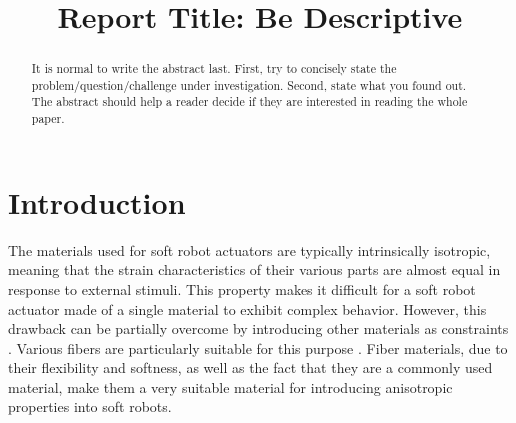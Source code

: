 \documentclass[conference]{IEEEtran}
\begin{document}
\title{Report Title: Be Descriptive}

\author{
    \and
}

\maketitle

\begin{abstract}
It is normal to write the abstract last.  First, try to concisely state the problem/question/challenge under investigation.  Second, state what you found out.  The abstract should help a reader decide if they are interested in reading the whole paper.  
\end{abstract}

% 

\section{Introduction}

The materials used for soft robot actuators are typically intrinsically isotropic, meaning that the strain characteristics of their various parts are almost equal in response to external stimuli. This property makes it difficult for a soft robot actuator made of a single material to exhibit complex behavior. However, this drawback can be partially overcome by introducing other materials as constraints . Various fibers are particularly suitable for this purpose \cite{overview}. Fiber materials, due to their flexibility and softness, as well as the fact that they are a commonly used material, make them a very suitable material for introducing anisotropic properties into soft robots.
\end{document}
